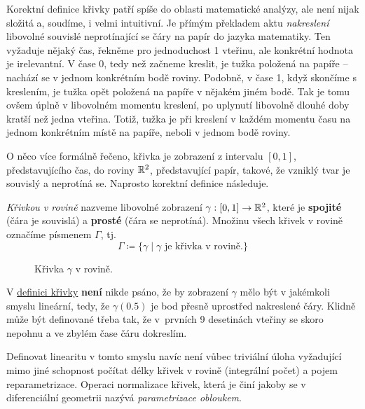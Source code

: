 Korektní definice křivky patří spíše do oblasti matematické analýzy, ale není
nijak složitá a, soudíme, i velmi intuitivní. Je přímým překladem aktu
\emph{nakreslení} libovolné souvislé neprotínající se čáry na papír do jazyka
matematiky. Ten vyžaduje nějaký čas, řekněme pro jednoduchost 1 vteřinu, ale
konkrétní hodnota je irelevantní. V čase 0, tedy než začneme kreslit, je tužka
položená na papíře -- nachází se v jednom konkrétním bodě roviny. Podobně, v
čase 1, když skončíme s kreslením, je tužka opět položená na papíře v nějakém
jiném bodě. Tak je tomu ovšem úplně v libovolném momentu kreslení, po uplynutí
libovolně dlouhé doby kratší než jedna vteřina. Totiž, tužka je při kreslení v
každém momentu času na jednom konkrétním místě na papíře, neboli v jednom bodě
roviny.

O něco více formálně řečeno, křivka je zobrazení z intervalu $[0,1]$,
představujícího čas, do roviny $\mathbb{R}^2$, představující papír, takové, že vzniklý
tvar je souvislý a neprotíná se. Naprosto korektní definice následuje.

\begin{definition}
 \label{def:krivka-v-rovine}
 \emph{Křivkou v rovině} nazveme libovolné zobrazení $\gamma:[0,1] \to \mathbb{R}^2$,
 které je \textbf{spojité} (čára je souvislá) a \textbf{prosté} (čára se
 neprotíná). Množinu všech křivek v rovině označíme písmenem $\Gamma$, tj.
 \[
  \Gamma \coloneqq \{\gamma \mid \gamma \text{ je křivka v rovině.}\}
 \]
\end{definition}

\begin{figure}[h]
 \centering

 \caption{Křivka $\gamma$ v rovině.}
 \label{fig:krivka-v-rovine}
\end{figure}

\begin{warning}
 V \hyperref[def:krivka-v-rovine]{definici křivky} \textbf{není} nikde psáno, že
 by zobrazení $\gamma$ mělo být v jakémkoli smyslu lineární, tedy, že
 $\gamma(0.5)$ je bod přesně uprostřed nakreslené čáry. Klidně může být
 definované třeba tak, že v~prvních 9 desetinách vteřiny se skoro nepohnu a ve
 zbylém čase čáru dokreslím.

 Definovat linearitu v tomto smyslu navíc není vůbec triviální úloha vyžadující
 mimo jiné schopnost počítat délky křivek v rovině (integrální počet) a pojem
 reparametrizace. Operaci normalizace křivek, která je činí jakoby 
 se v diferenciální geometrii nazývá \emph{parametrizace obloukem}.
\end{warning}

